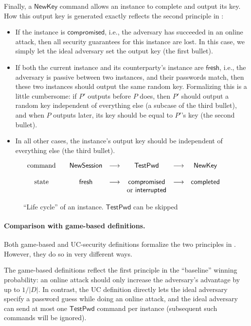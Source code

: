 \documentclass{article}
\newcommand{\NewSession}{\mathsf{NewSession}}
\newcommand{\TestPwd}{\mathsf{TestPwd}}
\newcommand{\NewKey}{\mathsf{NewKey}}
\newcommand{\fresh}{\mathsf{fresh}}
\newcommand{\compromised}{\mathsf{compromised}}
\newcommand{\interrupted}{\mathsf{interrupted}}
\newcommand{\completed}{\mathsf{completed}}
\begin{document}
Finally, a $\NewKey$ command allows an instance to complete and output its key. How this output key is generated exactly reflects the second principle in :
\begin{itemize}
  \item If the instance is $\compromised$, i.e., the adversary has succeeded in an online attack, then all security guarantees for this instance are lost. In this case, we simply let the ideal adversary set the output key (the first bullet).
  \item If both the current instance and its counterparty's instance are $\fresh$, i.e., the adversary is passive between two instances, and their passwords match, then these two instances should output the same random key. Formalizing this is a little cumbersome: if $P'$ outputs before $P$ does, then $P'$ should output a random key independent of everything else (a subcase of the third bullet), and when $P$ outputs later, its key should be equal to $P'$'s key (the second bullet).
  \item In all other cases, the instance's output key should be independent of everything else (the third bullet).
\end{itemize}
\begin{figure}[H]
\begin{center}
$
\begin{array}{c c c c c c c}
\text{command} & & \NewSession & \longrightarrow & \TestPwd & \longrightarrow & \NewKey \\
\\
\text{state} & & \fresh & \longrightarrow & \compromised & \longrightarrow & \completed \\
 & & & & \text{or }\interrupted & &
\end{array}
$
\end{center}
\caption{``Life cycle'' of an instance. $\TestPwd$ can be skipped}
\end{figure}
\paragraph{Comparison with game-based definitions.}
Both game-based and UC-security definitions formalize the two principles in . However, they do so in very different ways.

The game-based definitions reflect the first principle in the ``baseline'' winning probability: an online attack should only increase the adversary's advantage by up to $1/|D|$. In contrast, the UC definition directly lets the ideal adversary specify a password guess while doing an online attack, and the ideal adversary can send at most one $\TestPwd$ command per instance (subsequent such commands will be ignored).
\end{document}
